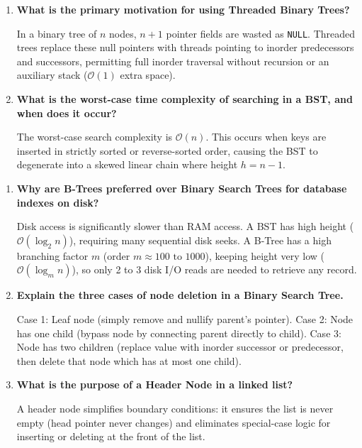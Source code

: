 \documentclass[12pt,a4paper]{article}
\newcommand{\Q}[1]{\textbf{#1}\par\noindent\ignorespaces}
\begin{document}
\begin{tcolorbox}[exambox, title={\textbf{Frequently Asked / Viva Questions (Part 1)}}]
\begin{enumerate}[topsep=0pt, label=\textbf{Q\arabic*.}, itemsep=4pt]
  \item \Q{What is the primary motivation for using Threaded Binary Trees?}
  In a binary tree of $n$ nodes, $n+1$ pointer fields are wasted as \texttt{NULL}. Threaded trees replace these null pointers with threads pointing to inorder predecessors and successors, permitting full inorder traversal without recursion or an auxiliary stack ($\mathcal{O}(1)$ extra space).

  \item \Q{What is the worst-case time complexity of searching in a BST, and when does it occur?}
  The worst-case search complexity is $\mathcal{O}(n)$. This occurs when keys are inserted in strictly sorted or reverse-sorted order, causing the BST to degenerate into a skewed linear chain where height $h = n - 1$.
\end{enumerate}
\end{tcolorbox}

\newpage

\begin{tcolorbox}[exambox, title={\textbf{Frequently Asked / Viva Questions (Part 2)}}]
\begin{enumerate}[topsep=0pt, label=\textbf{Q\arabic*.}, itemsep=4pt, start=8]
  \item \Q{Why are B-Trees preferred over Binary Search Trees for database indexes on disk?}
  Disk access is significantly slower than RAM access. A BST has high height ($\mathcal{O}(\log_2 n)$), requiring many sequential disk seeks. A B-Tree has a high branching factor $m$ (order $m \approx 100 \text{ to } 1000$), keeping height very low ($\mathcal{O}(\log_m n)$), so only 2 to 3 disk I/O reads are needed to retrieve any record.

  \item \Q{Explain the three cases of node deletion in a Binary Search Tree.}
  Case 1: Leaf node (simply remove and nullify parent's pointer). Case 2: Node has one child (bypass node by connecting parent directly to child). Case 3: Node has two children (replace value with inorder successor or predecessor, then delete that node which has at most one child).

  \item \Q{What is the purpose of a Header Node in a linked list?}
  A header node simplifies boundary conditions: it ensures the list is never empty (head pointer never changes) and eliminates special-case logic for inserting or deleting at the front of the list.
\end{enumerate}
\end{tcolorbox}
\end{document}
